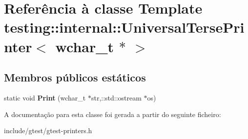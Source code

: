 \hypertarget{classtesting_1_1internal_1_1UniversalTersePrinter_3_01wchar__t_01_5_01_4}{\section{Referência à classe Template testing\-:\-:internal\-:\-:Universal\-Terse\-Printer$<$ wchar\-\_\-t $\ast$ $>$}
\label{classtesting_1_1internal_1_1UniversalTersePrinter_3_01wchar__t_01_5_01_4}
}
\subsection*{Membros públicos estáticos}
\begin{DoxyCompactItemize}
\item 
\hypertarget{classtesting_1_1internal_1_1UniversalTersePrinter_3_01wchar__t_01_5_01_4_af6009c8891ea3bdc190eddf76228305a}{static void {\bfseries Print} (wchar\-\_\-t $\ast$str,\-::std\-::ostream $\ast$os)}\label{classtesting_1_1internal_1_1UniversalTersePrinter_3_01wchar__t_01_5_01_4_af6009c8891ea3bdc190eddf76228305a}

\end{DoxyCompactItemize}


A documentação para esta classe foi gerada a partir do seguinte ficheiro\-:\begin{DoxyCompactItemize}
\item 
include/gtest/gtest-\/printers.\-h\end{DoxyCompactItemize}
